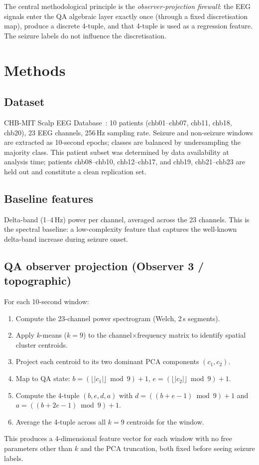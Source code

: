 \documentclass[11pt]{article}
\begin{document}
The central methodological principle is the \emph{observer-projection firewall}:
the EEG signals enter the QA algebraic layer exactly once (through a fixed
discretisation map), produce a discrete 4-tuple, and that 4-tuple is used
as a regression feature.  The seizure labels do not influence the discretisation.

\section{Methods}\label{sec:methods}

\subsection{Dataset}

CHB-MIT Scalp EEG Database~\cite{chbmit}: 10 patients
(chb01--chb07, chb11, chb18, chb20),
23 EEG channels, 256\,Hz sampling rate.  Seizure and non-seizure windows
are extracted as 10-second epochs; classes are balanced by undersampling
the majority class.  This patient subset was determined by data availability
at analysis time; patients chb08--chb10, chb12--chb17, and chb19, chb21--chb23
are held out and constitute a clean replication set.

\subsection{Baseline features}

Delta-band (1--4\,Hz) power per channel, averaged across the 23 channels.
This is the spectral baseline: a low-complexity feature that captures the
well-known delta-band increase during seizure onset.

\subsection{QA observer projection (Observer 3 / topographic)}

For each 10-second window:
\begin{enumerate}[label=(\arabic*)]
  \item Compute the 23-channel power spectrogram (Welch, 2\,s segments).
  \item Apply $k$-means ($k=9$) to the channel$\times$frequency matrix to
        identify spatial cluster centroids.
  \item Project each centroid to its two dominant PCA components $(c_1, c_2)$.
  \item Map to QA state: $b = (\lfloor |c_1| \rfloor \bmod 9) + 1$,
        $e = (\lfloor |c_2| \rfloor \bmod 9) + 1$.
  \item Compute the 4-tuple $(b, e, d, a)$ with
        $d = ((b+e-1)\bmod 9)+1$ and $a = ((b+2e-1)\bmod 9)+1$.
  \item Average the 4-tuple across all $k=9$ centroids for the window.
\end{enumerate}
This produces a 4-dimensional feature vector for each window
with no free parameters other than $k$ and the PCA truncation,
both fixed before seeing seizure labels.
\end{document}
